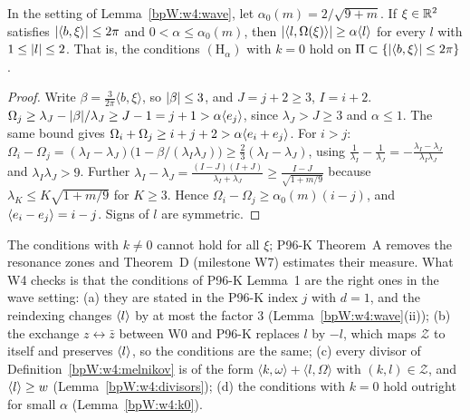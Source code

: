 \begin{lemma}[The conditions with $k=0$ for the wave frequencies]\label{bpW:w4:k0}
In the setting of Lemma~\ref{bpW:w4:wave}, let $\alpha_0(m)=2/\sqrt{9+m}$. If $\xi\in\mathbb{R}^2$ satisfies
$\lvert \langle b,\xi\rangle\rvert\le2\pi$ and $0<\alpha\le\alpha_0(m)$, then $\lvert \langle l,\Omega(\xi)\rangle\rvert\ge\alpha\langle l\rangle$ for
every $l$ with $1\le\lvert l\rvert\le2$. That is, the conditions $(\mathrm H_\alpha)$ with $k=0$ hold on
$\Pi\subset\{\lvert \langle b,\xi\rangle\rvert\le2\pi\}$.
\end{lemma}

\begin{proof}
Write $\beta=\frac3{2\pi}\langle b,\xi\rangle$, so $\lvert \beta\rvert\le3$, and $J=j+2\ge3$, $I=i+2$.
\label{stepW:w4:k0one}
$\Omega_j\ge\lambda_J-\lvert \beta\rvert/\lambda_J\ge J-1=j+1>\alpha\langle e_j\rangle$, since $\lambda_J>J\ge3$ and $\alpha\le1$. The
same bound gives $\Omega_i+\Omega_j\ge i+j+2>\alpha\langle e_i+e_j\rangle$.
\label{stepW:w4:k0diff}
For $i>j$: $\Omega_i-\Omega_j=(\lambda_I-\lambda_J)\bigl(1-\beta/(\lambda_I\lambda_J)\bigr)\ge\frac23(\lambda_I-\lambda_J)$, using
$\frac1{\lambda_I}-\frac1{\lambda_J}=-\frac{\lambda_I-\lambda_J}{\lambda_I\lambda_J}$ and $\lambda_I\lambda_J>9$. Further
$\lambda_I-\lambda_J=\frac{(I-J)(I+J)}{\lambda_I+\lambda_J}\ge\frac{I-J}{\sqrt{1+m/9}}$ because $\lambda_K\le K\sqrt{1+m/9}$ for
$K\ge3$. Hence $\Omega_i-\Omega_j\ge\alpha_0(m)(i-j)$, and $\langle e_i-e_j\rangle=i-j$. Signs of $l$ are symmetric.
\end{proof}

\begin{remark}\label{bpW:w4:melnikov-check}
The conditions with $k\ne0$ cannot hold for all $\xi$; P96-K Theorem~A removes the resonance zones and Theorem~D
(milestone W7) estimates their measure. What W4 checks is that the conditions of P96-K Lemma~1 are the right ones in
the wave setting: (a) they are stated in the P96-K index $j$ with $d=1$, and the reindexing changes $\langle l\rangle$ by at most
the factor $3$ (Lemma~\ref{bpW:w4:wave}(ii)); (b) the exchange $z\leftrightarrow\bar z$ between W0 and P96-K replaces
$l$ by $-l$, which maps $\mathcal Z$ to itself and preserves $\langle l\rangle$, so the conditions are the same; (c) every divisor
of Definition~\ref{bpW:w4:melnikov} is of the form $\langle k,\omega\rangle+\langle l,\Omega\rangle$ with
$(k,l)\in\mathcal Z$, and $\langle l\rangle\ge w$ (Lemma~\ref{bpW:w4:divisors}); (d) the conditions with $k=0$ hold outright for
small $\alpha$ (Lemma~\ref{bpW:w4:k0}).
\end{remark}

